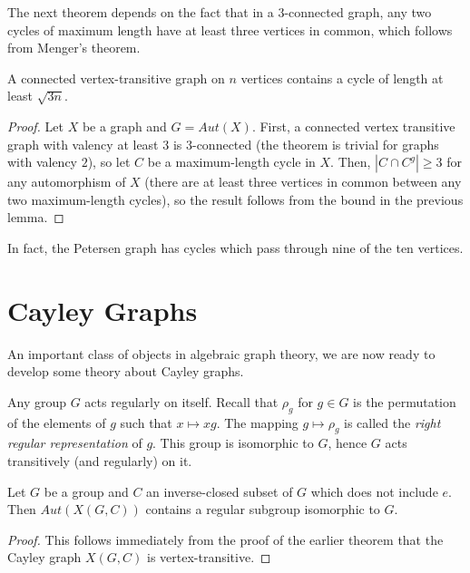 The next theorem depends on the fact that in a $3$-connected graph, any two cycles of maximum length have at least three vertices in common, which follows from Menger's theorem.

\begin{theorem}
	A connected vertex-transitive graph on $n$ vertices contains a cycle of length at least $\sqrt{3n}$.
	
	
\end{theorem}


\begin{proof}
	Let $X$ be a graph and $G=Aut(X)$.  First, a connected vertex transitive graph with valency at least $3$ is $3$-connected (the theorem is trivial for graphs with valency $2$), so let $C$ be a maximum-length cycle in $X$.  Then, $|C\cap C^g|\geq 3$ for any automorphism of $X$ (there are at least three vertices in common between any two maximum-length cycles), so the result follows from the bound in the previous lemma.
\end{proof}

In fact, the Petersen graph has cycles which pass through nine of the ten vertices.


\section*{Cayley Graphs}

An important class of objects in algebraic graph theory, we are now ready to develop some theory about Cayley graphs.


Any group $G$ acts regularly on itself.  Recall that $\rho_g$ for $g\in G$ is the permutation of the elements of $g$ such that $x\mapsto xg$.  The mapping $g\mapsto \rho_g$ is called the \textit{right regular representation} of $g$.  This group is isomorphic to $G$, hence $G$ acts transitively (and regularly) on it.

\begin{lemma}
	Let $G$ be a group and $C$ an inverse-closed subset of $G$ which does not include $e$.  Then $Aut(X(G,C))$ contains a regular subgroup isomorphic to $G$.
\end{lemma}
\begin{proof}
	This follows immediately from the proof of the earlier theorem that the Cayley graph $X(G,C)$ is vertex-transitive.
\end{proof}

